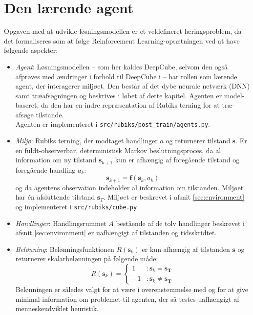 \documentclass[../main.tex]{subfiles}
\begin{document}
\section{Den lærende agent}\label{sec:learnADI}
Opgaven med at udvikle løsningsmodellen er et veldefineret læringsproblem, da det formaliseres som at følge Reinforcement Learning-opsætningen ved at have følgende aspekter:
\begin{itemize}
	\item \textit{Agent}: Løsningsmodellen -- som her kaldes DeepCube, selvom den også afprøves med ændringer i forhold til DeepCube i \cite{HumansBeGone} -- har rollen som lærende agent, der interagerer miljøet. Den består af det dybe neurale netværk (DNN) samt træafsøgningen og beskrives i løbet af dette kapitel. Agenten er model-baseret, da den har en indre repræsentation af Rubiks terning for at træ-afsøge tilstande.  \\
	Agenten er implementeret i  \texttt{src/rubiks/post\_train/agents.py}.
	\item \textit{Miljø}: Rubiks terning, der modtaget handlinger \(a\) og returnerer tilstand \(\mathbf s\). Er en fuldt-observerbar, deterministisk Markov beslutningsproces, da al information om ny tilstand \(\mathbf s_{k+1}\) kun er afhængig af foregående tilstand og foregående handling \(a_k\):
	\[
		\mathbf s _ {k+1} = \mathbf f(\mathbf s _k, a_k)
	\] 
	og da agentens observation indeholder al information om tilstanden. Miljøet har én afsluttende tilstand \(\mathbf s_T\). Miljøet er  beskrevet i afsnit \ref{sec:environment} og implementeret i \texttt{src/rubiks/cube.py} 
	\item  \textit{Handlinger}: Handlingsrummet \(A\) bestående af de tolv handlinger beskrevet i afsnit \ref{sec:environment} er uafhængigt af tilstanden og tidsskridtet.
	\item \textit{Belønning}: Belønningsfunktionen \( R(\mathbf s_k)\) er kun afhængig af tilstanden \(\mathbf s\) og returnerer skalarbelønningen på følgende måde:
	\[
		R (\mathbf s_k) = 
		\begin{cases}
			1  &: \mathbf s_k = \mathbf{s_T}\\
			-1 &: \mathbf s_k \neq \mathbf{s_T}
		\end{cases}
	\] 
	Belønningen er således valgt for at være i overenstemmelse med \cite{HumansBeGone} og for at give minimal information om problemet til agenten, der så testes uafhængigt af menneskeudviklet heuristik.
\end{itemize}
\end{document}
